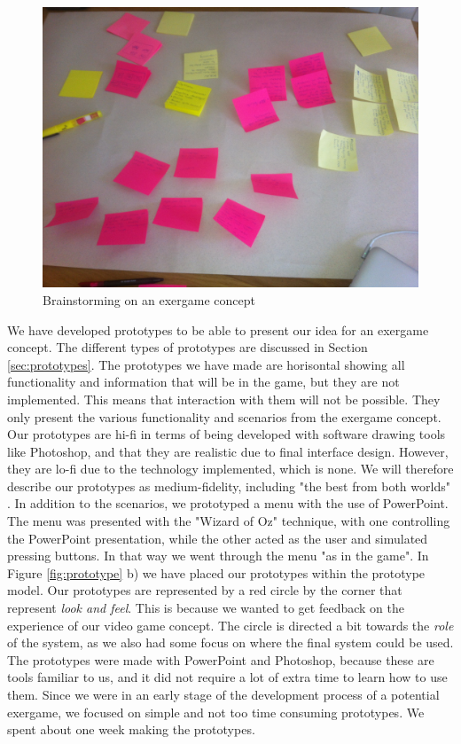 \begin{figure} [H]
\centering
\includegraphics[scale=0.07]{brainstorming}
\caption[Brainstorming on an exergame concept]{Brainstorming on an exergame concept}
\label{fig:brainstorming}
\end{figure} 

We have developed prototypes to be able to present our idea for an exergame concept. The different types of prototypes are discussed in Section \ref{sec:prototypes}. The prototypes we have made are horisontal showing all functionality and information that will be in the game, but they are not implemented. This means that interaction with them will not be possible. They only present the various functionality and scenarios from the exergame concept. Our prototypes are hi-fi in terms of being developed with software drawing tools like Photoshop, and that they are realistic due to final interface design. However, they are lo-fi due to the technology implemented, which is none. We will therefore describe our prototypes as medium-fidelity, including "the best from both worlds" \cite{mediumfidelity}. In addition to the scenarios, we prototyped a menu with the use of PowerPoint. The menu was presented with the "Wizard of Oz" technique, with one controlling the PowerPoint presentation, while the other acted as the user and simulated pressing buttons. In that way we went through the menu "as in the game". In Figure \ref{fig:prototype} b) we have placed our prototypes within the prototype model. Our prototypes are represented by a red circle by the corner that represent \emph{look and feel}. This is because we wanted to get feedback on the experience of our video game concept. The circle is directed a bit towards the \emph{role} of the system, as we also had some focus on where the final system could be used. The prototypes were made with PowerPoint and Photoshop, because these are tools familiar to us, and it did not require a lot of extra time to learn how to use them. Since we were in an early stage of the development process of a potential exergame, we focused on simple and not too time consuming prototypes. We spent about one week making the prototypes.

